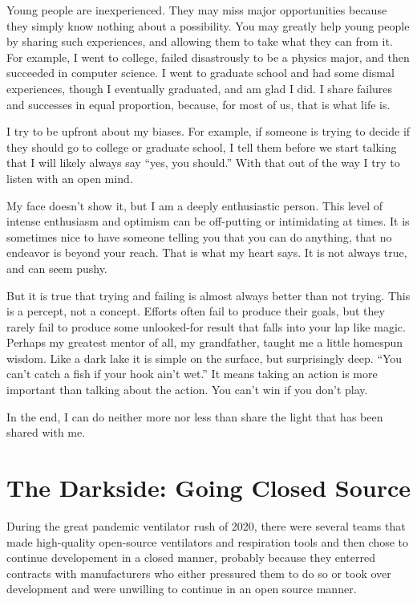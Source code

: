 \documentclass[
	fontsize=10pt, %
	twoside=false, %
	secnumdepth=1, %
]{kaobook}
\begin{document}
Young people are inexperienced. They may miss major opportunities
because they simply know nothing about a possibility. You may greatly
help young people by sharing such experiences, and allowing them to
take what they can from it. For example, I went to college, failed
disastrously to be a physics major, and then succeeded in computer
science. I went to graduate school and had some dismal experiences,
though I eventually graduated, and am glad I did. I share failures and
successes in equal proportion, because, for most of us, that is what
life is.

I try to be upfront about my biases. For example, if someone is trying
to decide if they should go to college or graduate school, I tell them
before we start talking that I will likely always say “yes, you
should.” With that out of the way I try to listen with an open mind.

My face doesn’t show it, but I am a deeply enthusiastic person. This
level of intense enthusiasm and optimism can be off-putting
or intimidating at times.
It is sometimes nice to have someone telling you that you
can do anything, that no endeavor is beyond your reach.
That is what my heart says. It is not always true, and can seem pushy.

But it is true that trying and failing is almost always better than
not trying. This is a percept, not a
concept.
Efforts often fail to produce their goals, but they rarely
fail to produce some unlooked-for result that falls into your lap like
magic.
Perhaps my greatest mentor of all, my grandfather, taught me a
little homespun wisdom.
Like a dark lake it is simple on  the surface,
but surprisingly deep.
“You can’t catch a fish if your hook ain’t
wet.”
It means taking an action is more important than talking about
the action.
You can’t win if you don’t play.

In the end, I can do neither more nor less than share the light that
has been shared with me.


\section{The Darkside: Going Closed Source}

During the great pandemic ventilator rush of 2020,
there were several teams that made high-quality
open-source ventilators and respiration tools and
then chose to continue developement in a closed manner,
probably because they enterred contracts with manufacturers
who either pressured them to do so or took over development
and were unwilling to continue in an open source manner.
\end{document}
